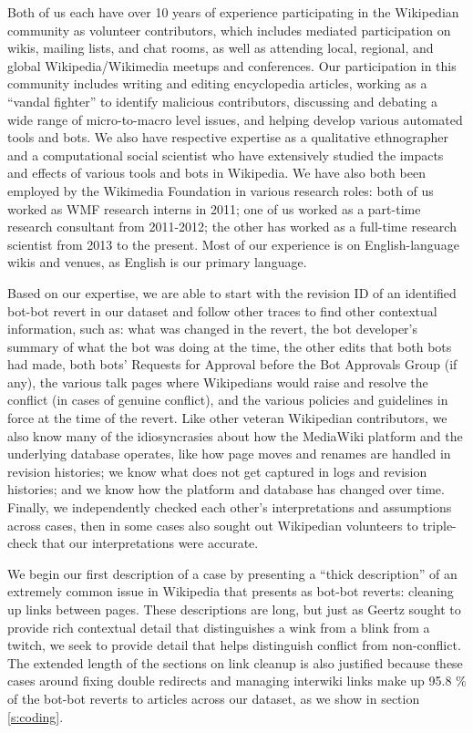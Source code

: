 \documentclass[format=acmsmall, review=false, screen=true]{acmart}%
\begin{document}
Both of us each have over 10 years of experience participating in the Wikipedian community as volunteer contributors, which includes mediated participation on wikis, mailing lists, and chat rooms, as well as attending local, regional, and global Wikipedia/Wikimedia meetups and conferences. Our participation in this community includes writing and editing encyclopedia articles, working as a ``vandal fighter'' to identify malicious contributors, discussing and debating a wide range of micro-to-macro level issues, and helping develop various automated tools and bots. We also have respective expertise as a qualitative ethnographer and a computational social scientist who have extensively studied the impacts and effects of various tools and bots in Wikipedia. We have also both been employed by the Wikimedia Foundation in various research roles: both of us worked as WMF research interns in 2011; one of us worked as a part-time research consultant from 2011-2012; the other has worked as a full-time research scientist from 2013 to the present. Most of our experience is on English-language wikis and venues, as English is our primary language.

Based on our expertise, we are able to start with the revision ID of an identified bot-bot revert in our dataset and follow other traces to find other contextual information, such as: what was changed in the revert, the bot developer's summary of what the bot was doing at the time, the other edits that both bots had made, both bots' Requests for Approval before the Bot Approvals Group (if any), the various talk pages where Wikipedians would raise and resolve the conflict (in cases of genuine conflict), and the various policies and guidelines in force at the time of the revert. Like other veteran Wikipedian contributors, we also know many of the idiosyncrasies about how the MediaWiki platform and the underlying database operates, like how page moves and renames are handled in revision histories; we know what does not get captured in logs and revision histories; and we know how the platform and database has changed over time. Finally, we independently checked each other's interpretations and assumptions across cases, then in some cases also sought out Wikipedian volunteers to triple-check that our interpretations were accurate. 

We begin our first description of a case by presenting a ``thick description'' \cite{Geertz1973} of an extremely common issue in Wikipedia that presents as bot-bot reverts: cleaning up links between pages. These descriptions are long, but just as Geertz sought to provide rich contextual detail that distinguishes a wink from a blink from a twitch, we seek to provide detail that helps distinguish conflict from non-conflict. The extended length of the sections on link cleanup is also justified because these cases around fixing double redirects and managing interwiki links make up 95.8 \% of the bot-bot reverts to articles across our dataset, as we show in section \ref{s:coding}. 
\end{document}

